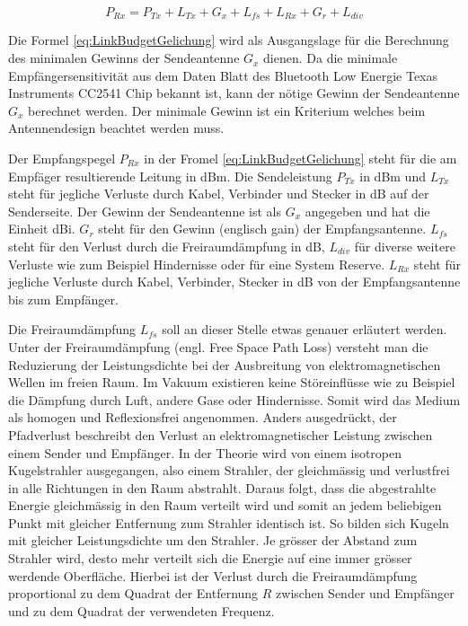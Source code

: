 \begin{equation}
P_{Rx} = P_{Tx}+L_{Tx}+G_{x}+L_{fs}+L_{Rx}+G_{r}+L_{div}\label{eq:LinkBudgetGelichung}
\end{equation}

Die Formel \ref{eq:LinkBudgetGelichung} wird als Ausgangslage für die Berechnung des minimalen Gewinns der Sendeantenne $G_{x}$ dienen. Da  die minimale Empfängersensitivität aus dem Daten Blatt des  Bluetooth Low Energie Texas Instruments CC2541 Chip bekannt ist, kann der nötige Gewinn der Sendeantenne $G_{x}$ berechnet werden. Der minimale Gewinn ist ein Kriterium welches beim Antennendesign beachtet werden muss.

Der Empfangspegel $P_{Rx}$ in der Fromel \ref{eq:LinkBudgetGelichung}  steht für die am Empfäger resultierende Leitung in dBm.  Die Sendeleistung $P_{Tx}$ in dBm und $L_{Tx}$ steht für jegliche Verluste durch Kabel, Verbinder und Stecker in dB auf der Senderseite. Der Gewinn der Sendeantenne ist als $G_{x}$ angegeben und hat die Einheit dBi. $G_{r}$ steht für den Gewinn (englisch gain) der Empfangsantenne. $L_{fs}$ steht für den Verlust durch die Freiraumdämpfung in dB, $L_{div}$  für diverse weitere Verluste wie zum Beispiel Hindernisse oder für eine System Reserve.  $L_{Rx}$ steht für jegliche Verluste durch Kabel, Verbinder, Stecker in dB von der Empfangsantenne bis zum Empfänger.


Die Freiraumdämpfung $L_{fs}$ soll an dieser Stelle etwas genauer erläutert werden. Unter der Freiraumdämpfung (engl. Free Space Path Loss)  versteht man die Reduzierung der Leistungsdichte bei der Ausbreitung von elektromagnetischen Wellen im freien Raum. Im Vakuum existieren keine Störeinflüsse wie zu Beispiel die Dämpfung durch Luft, andere Gase oder  Hindernisse. Somit wird das Medium als homogen  und Reflexionsfrei angenommen. Anders ausgedrückt, der Pfadverlust beschreibt den Verlust an elektromagnetischer Leistung zwischen einem Sender und Empfänger.
In der Theorie wird von einem isotropen Kugelstrahler ausgegangen, also einem Strahler, der gleichmässig und verlustfrei in alle Richtungen in den Raum abstrahlt. Daraus folgt, dass die abgestrahlte Energie gleichmässig in den Raum verteilt wird und somit an jedem beliebigen Punkt mit gleicher Entfernung zum Strahler identisch ist. So bilden sich Kugeln mit gleicher Leistungsdichte um den Strahler. Je grösser der Abstand zum Strahler wird, desto mehr verteilt sich die Energie auf eine immer grösser werdende Oberfläche. Hierbei ist der Verlust durch die Freiraumdämpfung proportional zu dem Quadrat der Entfernung $R$ zwischen Sender und Empfänger und zu dem Quadrat der verwendeten Frequenz.
\cite{linkbudget}


